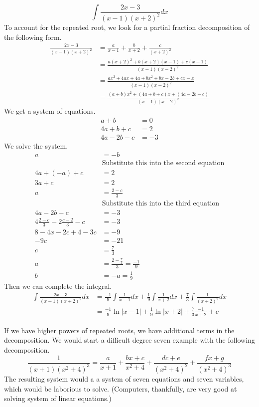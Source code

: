 \documentclass[fleqn]{report}
\begin{document}
\begin{example}
\begin{equation*}
\int \frac{2x-3}{(x-1)(x+2)^2}dx 
\end{equation*}
To account for the repeated root, we look for a partial
fraction decomposition of the following form.
\begin{align*}
\frac{2x-3}{(x-1)(x+2)^2} & = \frac{a}{x-1} + \frac{b}{x+2} +
\frac{c}{(x+2)^2} \\
& = \frac{a(x+2)^2 + b(x+2)(x-1) + c(x-1)}
{(x-1)(x-2)^2} \\
& = \frac{ax^2 + 4ax + 4a + bx^2 + bx - 2b + cx -x }
{(x-1)(x-2)^2} \\
& = \frac{(a+b)x^2 + (4a+b+c)x + (4a-2b-c)}
{(x-1)(x-2)^2} 
\end{align*}
We get a system of equations.
\begin{align*}
a+b & = 0\\
4a + b + c & = 2 \\
4a-2b-c & = -3 
\end{align*}
We solve the system. 
\begin{align*}
a & = -b \\
& \text{Substitute this into the second equation} \\
4a + (-a) + c & = 2 \\
3a + c & = 2 \\
a & = \frac{2-c}{3} \\
& \text{Substitute this into the third equation} \\
4a - 2b - c & = -3 \\
4 \frac{2-c}{3} - 2 \frac{c-2}{3} - c & = -3 \\
8 - 4x - 2c + 4 - 3c & = -9 \\
-9c & = -21 \\
c & = \frac{7}{3} \\
a & = \frac{2 - \frac{7}{3}}{3} = \frac{-1}{9} \\
b & = -a = \frac{1}{9} 
\end{align*}
Then we can complete the integral.
\begin{align*}
\int \frac{2x-3}{(x-1)(x+2)^2}dx & = \frac{-1}{9} \int
\frac{1}{x-1} dx + \frac{1}{9} \int \frac{1}{x+2} dx +
\frac{7}{3} \int \frac{1}{(x+2)^2}dx \\
& = \frac{-1}{9} \ln |x-1| + \frac{1}{9} \ln |x+2| + \frac{7}{3}
\frac{-1}{x+2} + c 
\end{align*}
\end{example}

\begin{example}
If we have higher powers of repeated roots, we have additional
terms in the decomposition. We would start a
difficult degree seven example with the following
decomposition.
\begin{equation*}
\frac{1}{(x+1)(x^2+4)^3} = \frac{a}{x+1} + \frac{bx+c}{x^2+4} +
\frac{dc + e}{(x^2+4)^2} + \frac{fx+g}{(x^2+4)^3}
\end{equation*}
The resulting system would a a system of seven equations and
seven variables, which would be laborious to solve.
(Computers, thankfully, are very good at solving system of
linear equations.)
\end{example}
\end{document}
